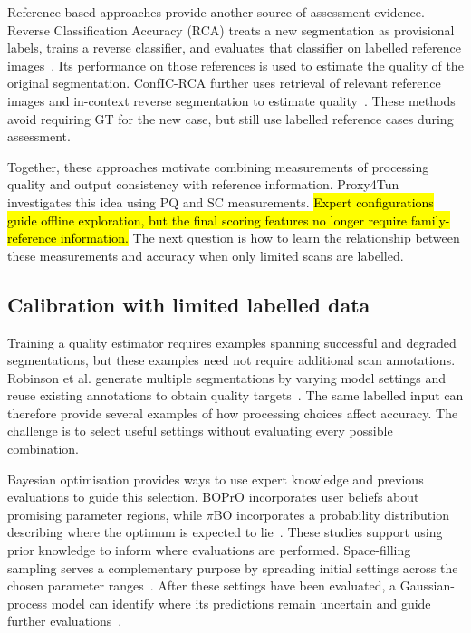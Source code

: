 \documentclass[a4paper,fleqn]{cas-dc}
\begin{document}
{Reference-based approaches provide another source of assessment evidence. Reverse Classification Accuracy (RCA) treats a new segmentation as provisional labels, trains a reverse classifier, and evaluates that classifier on labelled reference images~\cite{valindria2017rca}. Its performance on those references is used to estimate the quality of the original segmentation. ConfIC-RCA further uses retrieval of relevant reference images and in-context reverse segmentation to estimate quality~\cite{cosarinsky2026conficrca}. These methods avoid requiring GT for the new case, but still use labelled reference cases during assessment.

Together, these approaches motivate combining measurements of processing quality and output consistency with reference information. Proxy4Tun investigates this idea using PQ and SC measurements. \hl{Expert configurations guide offline exploration, but the final scoring features no longer require family-reference information.} The next question is how to learn the relationship between these measurements and accuracy when only limited scans are labelled.

\subsection{Calibration with limited labelled data}

Training a quality estimator requires examples spanning successful and degraded segmentations, but these examples need not require additional scan annotations. Robinson et al. generate multiple segmentations by varying model settings and reuse existing annotations to obtain quality targets~\cite{robinson2018segmentationQuality}. The same labelled input can therefore provide several examples of how processing choices affect accuracy. The challenge is to select useful settings without evaluating every possible combination.

Bayesian optimisation provides ways to use expert knowledge and previous evaluations to guide this selection. BOPrO incorporates user beliefs about promising parameter regions, while $\pi$BO incorporates a probability distribution describing where the optimum is expected to lie~\cite{souza2020prior,hvarfner2022pibo}. These studies support using prior knowledge to inform where evaluations are performed. Space-filling sampling serves a complementary purpose by spreading initial settings across the chosen parameter ranges~\cite{joe2008constructing}. After these settings have been evaluated, a Gaussian-process model can identify where its predictions remain uncertain and guide further evaluations~\cite{gramacy2009adaptive,gramacy2020surrogates}.

}
\end{document}

